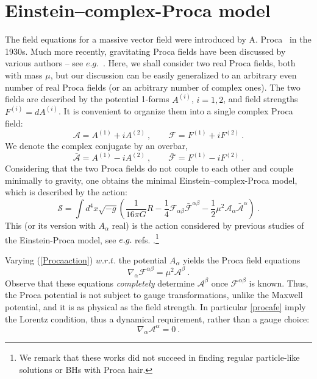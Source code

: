 \section{Einstein--complex-Proca model}
\label{Psec_model}
The field equations for a massive vector field were introduced by A. Proca~\cite{Proca} in the 1930s. Much more recently, gravitating Proca fields have been discussed by various authors -- see $e.g.$~\cite{Rosen:1994rq,Obukhov:1999ed,Toussaint:1999zz}. Here, we shall consider  two real Proca fields, both with mass $\mu$, but our discussion can be easily generalized to an arbitrary even number of real Proca fields (or an arbitrary number of complex ones). 
The two fields are described by the potential 1-forms $A^{(i)}$, $i=1,2$, and field strengths $F^{(i)}=dA^{(i)}$. It is convenient to organize them into a single complex Proca field:
\begin{equation}
\mathcal{A}=A^{(1)}+iA^{(2)} \ , \qquad \mathcal{F}=F^{(1)}+iF^{(2)} \ .
\end{equation}
We denote the complex conjugate by an overbar,
\begin{equation}
\bar{\mathcal{A}}=A^{(1)}-iA^{(2)} \ , \qquad \bar{\mathcal{F}}=F^{(1)}-iF^{(2)} \ .
\end{equation}
Considering that the two Proca fields do not couple to each other and couple minimally to gravity, one obtains the minimal Einstein--complex-Proca model, which is  
described by the action:
\begin{equation}
\label{Procaaction}
\mathcal{S}=\int d^4x \sqrt{-g}\left(\frac{1}{16 \pi  G}R
-\frac{1}{4}\mathcal{F}_{\alpha\beta}\bar{\mathcal{F}}^{\alpha\beta}
-\frac{1}{2}\mu^2\mathcal{A}_\alpha\bar{\mathcal{A}}^\alpha\right) \ .
\end{equation}
This (or its version with $A_\alpha$ real) 
is the action considered by previous studies of the Einstein-Proca model, see
$e.g.$ refs. \cite{Rosen:1994rq,Vuille:2002qz}.\footnote{We remark that these works did not succeed in finding regular particle-like solutions or BHs with Proca hair.}

Varying  (\ref{Procaaction}) $w.r.t.$ the potential $A_\alpha$ yields the Proca field equations
\begin{equation}
\nabla_\alpha\mathcal{F}^{\alpha\beta}=\mu^2 \mathcal{A}^\beta \ .
\label{procafe}
\end{equation}
Observe that these equations \textit{completely} determine $ \mathcal{A}^\beta$ once $\mathcal{F}^{\alpha\beta}$ is known. Thus, the Proca potential is not subject to gauge transformations, unlike the Maxwell potential, and it is as physical as the field strength. In particular \eqref{procafe} imply the Lorentz condition, thus a dynamical requirement, rather than a gauge choice:
\begin{equation}
\nabla_\alpha\mathcal{A}^\alpha = 0 \ .
\label{lorentz}
\end{equation}


